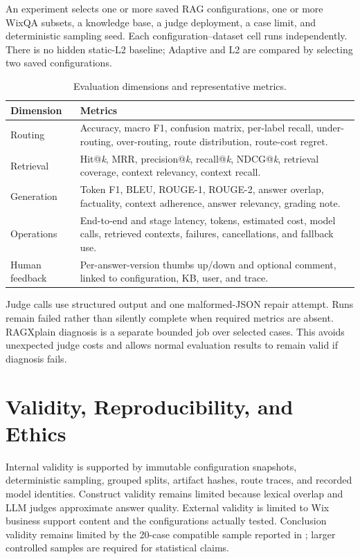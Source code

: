 An experiment selects one or more saved RAG configurations, one or more WixQA
subsets, a knowledge base, a judge deployment, a case limit, and deterministic
sampling seed. Each configuration--dataset cell runs independently. There is
no hidden static-L2 baseline; Adaptive and L2 are compared by selecting two
saved configurations.

\begin{table}[H]
  \centering
  \caption{Evaluation dimensions and representative metrics.}
  \label{tab:evaluation-metrics}
  \begin{tabularx}{\textwidth}{p{}X}
    \toprule
    Dimension & Metrics\\
    \midrule
    Routing & Accuracy, macro F1, confusion matrix, per-label recall,
    under-routing, over-routing, route distribution, route-cost regret.\\
    Retrieval & Hit@\textit{k}, MRR, precision@\textit{k}, recall@\textit{k},
    NDCG@\textit{k}, retrieval coverage, context relevancy, context recall.\\
    Generation & Token F1, BLEU, ROUGE-1, ROUGE-2, answer overlap,
    factuality, context adherence, answer relevancy, grading note.\\
    Operations & End-to-end and stage latency, tokens, estimated cost, model
    calls, retrieved contexts, failures, cancellations, and fallback use.\\
    Human feedback & Per-answer-version thumbs up/down and optional comment,
    linked to configuration, KB, user, and trace.\\
    \bottomrule
  \end{tabularx}
\end{table}

Judge calls use structured output and one malformed-JSON repair attempt. Runs
remain failed rather than silently complete when required metrics are absent.
RAGXplain diagnosis is a separate bounded job over selected cases. This avoids
unexpected judge costs and allows normal evaluation results to remain valid if
diagnosis fails.



\section{Validity, Reproducibility, and Ethics}

Internal validity is supported by immutable configuration snapshots,
deterministic sampling, grouped splits, artifact hashes, route traces, and
recorded model identities. Construct validity remains limited because lexical
overlap and LLM judges approximate answer quality. External validity is limited
to Wix business support content and the configurations actually tested.
Conclusion validity remains limited by the 20-case compatible sample reported
in ; larger controlled samples are required
for statistical claims.

